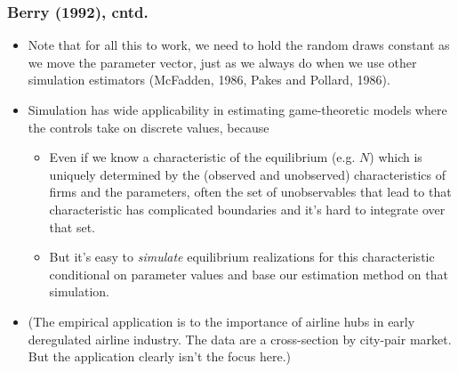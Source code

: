 \documentclass[aspectratio=169,11pt]{beamer}
\begin{document}
\begin{frame}
\frametitle{Berry (1992), cntd.}
\footnotesize
\begin{itemize}
\item Note that for all this to work, we need to hold the random draws
constant as we move the parameter vector, just as we always do when we use
other simulation estimators (McFadden, 1986, Pakes and Pollard, 1986).
\item Simulation has wide applicability in estimating game-theoretic models
where the controls take on discrete values, because
\begin{itemize}
\item Even if we know a characteristic of the equilibrium (e.g. $N$) which
is uniquely determined by the (observed and unobserved) characteristics of
firms and the parameters, often the set of unobservables that lead to that
characteristic has complicated boundaries and it's hard to integrate over
that set.
\item But it's easy to \textit{simulate} equilibrium realizations for this
characteristic conditional on parameter values and base our estimation
method on that simulation.
\end{itemize}
\item (The empirical application is to the importance of airline hubs in
early deregulated airline industry. The data are a cross-section by
city-pair market. But the application clearly isn't the focus here.)
\end{itemize}
\end{frame}
\end{document}

